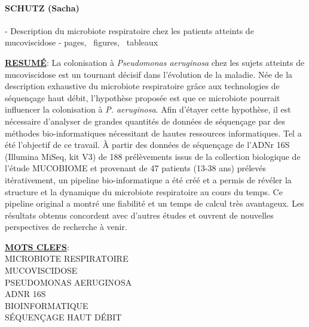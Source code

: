 \documentclass[12pt,a4paper]{article}
\begin{document}
\noindent
\centering

\begin{minipage}[t][2cm]{15cm}
\paragraph{SCHUTZ (Sacha)} - Description du microbiote respiratoire chez les patients atteints de mucoviscidose - \pageref{LastPage} pages, \totalfigures\ figures, \totaltables\ tableaux \\
\end{minipage}


\begin{minipage}[t][9.5cm]{15cm}
\textbf{\underline{RESUMÉ}}:
La colonisation à \textit{Pseudomonas aeruginosa} chez les sujets atteints de mucoviscidose est un tournant décisif dans l'évolution de la maladie. Née de la description exhaustive du microbiote respiratoire grâce aux technologies de séquençage haut débit, l'hypothèse proposée est que ce microbiote pourrait influencer la colonisation à \textit{P. aeruginosa}. Afin d'étayer cette hypothèse, il est nécessaire d'analyser de grandes quantités de données de séquençage par des méthodes bio-informatiques nécessitant de hautes ressources informatiques. Tel a été l'objectif de ce travail. À partir des données de séquençage de l'ADNr 16S (Illumina MiSeq, kit V3) de 188 prélèvements issus de la collection biologique de l'étude MUCOBIOME et provenant de 47 patients (13-38 ans) prélevés itérativement, un pipeline bio-informatique a été créé et a permis de révéler la structure et la dynamique du microbiote respiratoire au cours du temps. Ce pipeline original a montré une fiabilité et un temps de calcul très avantageux. Les résultats obtenus concordent avec d'autres études et ouvrent de nouvelles perspectives de recherche à venir.
 \end{minipage}


\begin{minipage}[t][4.9cm]{15cm}
\textbf{\underline{MOTS CLEFS}}: \\
MICROBIOTE RESPIRATOIRE\\
MUCOVISCIDOSE\\
PSEUDOMONAS AERUGINOSA\\
ADNR 16S\\
BIOINFORMATIQUE\\
SÉQUENÇAGE HAUT DÉBIT\\
 \end{minipage}
\end{document}
